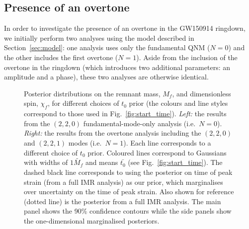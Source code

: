 \subsection{Presence of an overtone}\label{subsec:overtone}

In order to investigate the presence of an overtone in the GW150914 ringdown, we initially perform two analyses using the model described in Section~\ref{sec:model}: one analysis uses only the fundamental QNM ($N=0$) and the other includes the first overtone ($N=1$).
Aside from the inclusion of the overtone in the ringdown (which introduces two additional parameters: an amplitude and a phase), these two analyses are otherwise identical.

\begin{figure}[t]
    \captionsetup[subfigure]{labelformat=empty}
    \centering
    \;
    \;
    \caption[Posteriors on the GW150914 remnant mass and spin for different choices of the ringdown start-time prior]{  
    Posterior distributions on the remnant mass, $M_f$, and dimensionless spin, $\chi_f$, for different choices of $t_0$ prior (the colours and line styles correspond to those used in Fig.~\ref{fig:start_time}). 
    \emph{Left:} the results from the $(2,2,0)$ fundamental-mode-only analysis (i.e.\ $N=0$).
    \emph{Right:} the results from the overtone analysis including the $(2,2,0)$ and $(2,2,1)$ modes (i.e.\ $N=1$).
    Each line corresponds to a different choice of $t_0$ prior. 
    Coloured lines correspond to Gaussians with widths of $1 \tilde{M_f}$ and means $\bar{t_0}$ (see Fig.~\ref{fig:start_time}).
    The dashed black line corresponds to using the posterior on time of peak strain (from a full IMR analysis) as our prior, which marginalises over uncertainty on the time of peak strain.
    Also shown for reference (dotted line) is the posterior from a full IMR analysis. 
    The main panel shows the 90\% confidence contours while the side panels show the one-dimensional marginalised posteriors.
    }
    \label{fig:mass_spin_post}
\end{figure}

